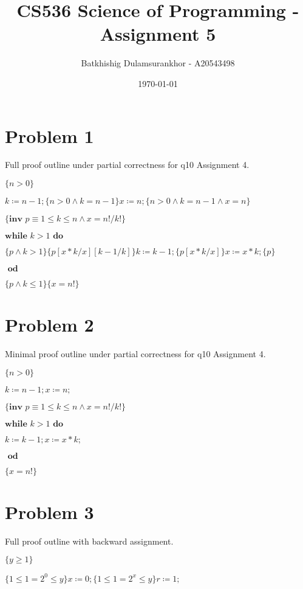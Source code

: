 \documentclass{article}
\title{CS536 Science of Programming - Assignment 5}
\author{Batkhishig Dulamsurankhor - A20543498}
\date{\today} %
\begin{document}
\maketitle


\section*{Problem 1}

Full proof outline under partial correctness for q10 Assignment 4.
\vspace{10pt}

$\{n>0\}$

$k \coloneqq n-1; \{n>0 \wedge k=n-1\} x \coloneqq n; \{n>0 \wedge k=n-1 \wedge x=n\}$

$\{\textbf{inv }p \equiv 1 \leq k \leq n \wedge x=n!/k! \}$

$ \textbf{while } k>1 \textbf{ do }$

\qquad \qquad $\{p \wedge k>1\}\{p[x*k/x][k-1/k]\}k \coloneqq k-1; \{p[x*k/x]\}x \coloneqq x*k; \{p\}$

$\textbf{ od}$

$\{p \wedge k \leq 1\}\{x=n!\}$


\section*{Problem 2}

Minimal proof outline under partial correctness for q10 Assignment 4.
\vspace{10pt}

$\{n>0\}$

$k \coloneqq n-1; x \coloneqq n;$

$\{\textbf{inv }p \equiv 1 \leq k \leq n \wedge x=n!/k! \}$

$ \textbf{while } k>1 \textbf{ do }$

\qquad \qquad $k \coloneqq k-1; x \coloneqq x*k;$

$\textbf{ od}$

$\{x=n!\}$


\section*{Problem 3}

Full proof outline with backward assignment.

\vspace{10pt}

$ \{y \geq 1\} $

$ \{1 \leq 1=2^0 \leq y\} x \coloneqq0;\{1 \leq 1=2^x \leq y\} r \coloneqq 1; $
\end{document}
